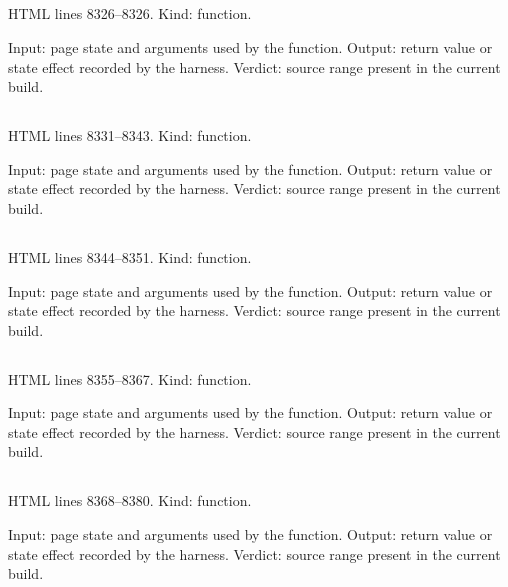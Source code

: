 \subsection*{\texttt{}}
\label{vf_451_makeRDML}
HTML lines 8326--8326. Kind: function.

Input: page state and arguments used by the function.
Output: return value or state effect recorded by the harness.
Verdict: source range present in the current build.

\subsection*{\texttt{}}
\label{vf_452_makeQpcrWide}
HTML lines 8331--8343. Kind: function.

Input: page state and arguments used by the function.
Output: return value or state effect recorded by the harness.
Verdict: source range present in the current build.

\subsection*{\texttt{}}
\label{vf_453_makeQpcrWideTables}
HTML lines 8344--8351. Kind: function.

Input: page state and arguments used by the function.
Output: return value or state effect recorded by the harness.
Verdict: source range present in the current build.

\subsection*{\texttt{}}
\label{vf_454_makeBaselineCSV}
HTML lines 8355--8367. Kind: function.

Input: page state and arguments used by the function.
Output: return value or state effect recorded by the harness.
Verdict: source range present in the current build.

\subsection*{\texttt{}}
\label{vf_455_makeRDES}
HTML lines 8368--8380. Kind: function.

Input: page state and arguments used by the function.
Output: return value or state effect recorded by the harness.
Verdict: source range present in the current build.

